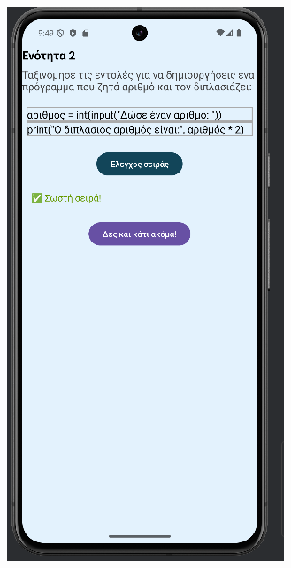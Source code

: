 \documentclass[11pt]{report}
\begin{document}
\begin{figure}[H]
  \centering
  \begin{minipage}[b]{0.45\textwidth}
    \includegraphics[width=\linewidth, height=0.35\textheight, keepaspectratio]{Figures/εικόνα (16).png}

\end{minipage}
\end{figure}
\end{document}
